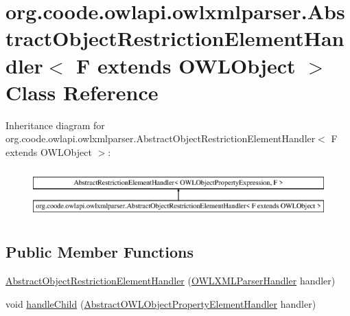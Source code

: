 \hypertarget{classorg_1_1coode_1_1owlapi_1_1owlxmlparser_1_1_abstract_object_restriction_element_handler_3_01a6e5f481157414f81851a356a68b7bfb}{\section{org.\-coode.\-owlapi.\-owlxmlparser.\-Abstract\-Object\-Restriction\-Element\-Handler$<$ F extends O\-W\-L\-Object $>$ Class Reference}
\label{classorg_1_1coode_1_1owlapi_1_1owlxmlparser_1_1_abstract_object_restriction_element_handler_3_01a6e5f481157414f81851a356a68b7bfb}
}
Inheritance diagram for org.\-coode.\-owlapi.\-owlxmlparser.\-Abstract\-Object\-Restriction\-Element\-Handler$<$ F extends O\-W\-L\-Object $>$\-:\begin{figure}[H]
\begin{center}
\leavevmode
\includegraphics[height=1.924399cm]{classorg_1_1coode_1_1owlapi_1_1owlxmlparser_1_1_abstract_object_restriction_element_handler_3_01a6e5f481157414f81851a356a68b7bfb}
\end{center}
\end{figure}
\subsection*{Public Member Functions}
\begin{DoxyCompactItemize}
\item 
\hyperlink{classorg_1_1coode_1_1owlapi_1_1owlxmlparser_1_1_abstract_object_restriction_element_handler_3_01a6e5f481157414f81851a356a68b7bfb_a44789a492df7829ec94574d1125a8f77}{Abstract\-Object\-Restriction\-Element\-Handler} (\hyperlink{classorg_1_1coode_1_1owlapi_1_1owlxmlparser_1_1_o_w_l_x_m_l_parser_handler}{O\-W\-L\-X\-M\-L\-Parser\-Handler} handler)
\item 
void \hyperlink{classorg_1_1coode_1_1owlapi_1_1owlxmlparser_1_1_abstract_object_restriction_element_handler_3_01a6e5f481157414f81851a356a68b7bfb_a0bea0eaa9ef28ca4137102a732598aff}{handle\-Child} (\hyperlink{classorg_1_1coode_1_1owlapi_1_1owlxmlparser_1_1_abstract_o_w_l_object_property_element_handler}{Abstract\-O\-W\-L\-Object\-Property\-Element\-Handler} handler)
\end{DoxyCompactItemize}


